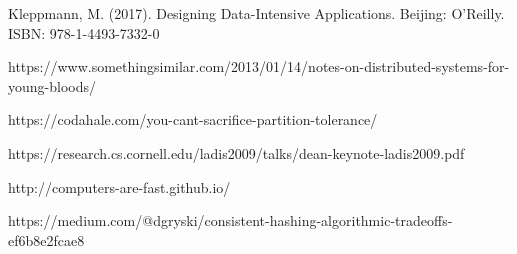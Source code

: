 \documentclass{article}
\begin{document}
\begin{thebibliography}{}
Kleppmann, M. (2017). Designing Data-Intensive Applications. Beijing: O'Reilly. ISBN: 978-1-4493-7332-0

https://www.somethingsimilar.com/2013/01/14/notes-on-distributed-systems-for-young-bloods/

https://codahale.com/you-cant-sacrifice-partition-tolerance/


https://research.cs.cornell.edu/ladis2009/talks/dean-keynote-ladis2009.pdf

http://computers-are-fast.github.io/

https://medium.com/@dgryski/consistent-hashing-algorithmic-tradeoffs-ef6b8e2fcae8

\end{thebibliography}
\end{document}
